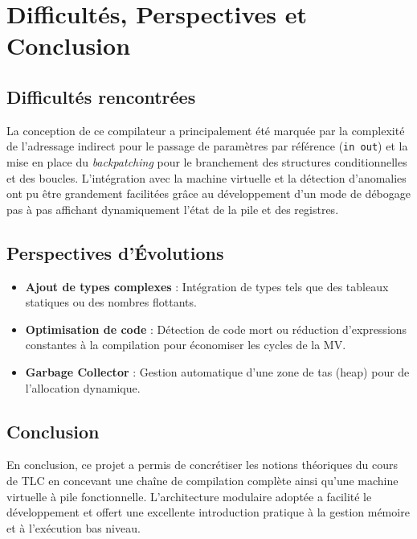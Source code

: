 \documentclass[a4paper, 12pt]{article}
\begin{document}
\newpage

\section{Difficultés, Perspectives et Conclusion}

\subsection{Difficultés rencontrées}
La conception de ce compilateur a principalement été marquée par la complexité de l'adressage indirect pour le passage de paramètres par référence (\texttt{in out}) et la mise en place du \emph{backpatching} pour le branchement des structures conditionnelles et des boucles. L'intégration avec la machine virtuelle et la détection d'anomalies ont pu être grandement facilitées grâce au développement d'un mode de débogage pas à pas affichant dynamiquement l'état de la pile et des registres.

\subsection{Perspectives d'Évolutions}
\begin{itemize}
    \item \textbf{Ajout de types complexes} : Intégration de types tels que des tableaux statiques ou des nombres flottants.
    \item \textbf{Optimisation de code} : Détection de code mort ou réduction d'expressions constantes à la compilation pour économiser les cycles de la MV.
    \item \textbf{Garbage Collector} : Gestion automatique d'une zone de tas (heap) pour de l'allocation dynamique.
\end{itemize}

\subsection{Conclusion}
En conclusion, ce projet a permis de concrétiser les notions théoriques du cours de TLC en concevant une chaîne de compilation complète ainsi qu'une machine virtuelle à pile fonctionnelle. L'architecture modulaire adoptée a facilité le développement et offert une excellente introduction pratique à la gestion mémoire et à l'exécution bas niveau.
\end{document}
